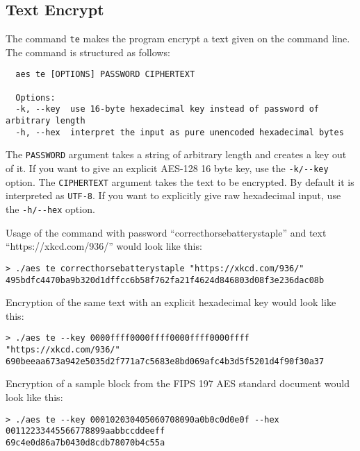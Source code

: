 \subsection{Text Encrypt}
The command \lstinline{te} makes the program encrypt a text given on the command line. The command is structured as follows:
\begin{lstlisting}
  aes te [OPTIONS] PASSWORD CIPHERTEXT

  Options:
  -k, --key  use 16-byte hexadecimal key instead of password of arbitrary length
  -h, --hex  interpret the input as pure unencoded hexadecimal bytes
\end{lstlisting}

The \lstinline{PASSWORD} argument takes a string of arbitrary length and creates a key out of it. If you want to give an explicit AES-128 16 byte key, use the \lstinline{-k/--key} option. The \lstinline{CIPHERTEXT} argument takes the text to be encrypted. By default it is interpreted as \lstinline{UTF-8}. If you want to explicitly give raw hexadecimal input, use the \lstinline{-h/--hex} option.

Usage of the command with password \enquote{correcthorsebatterystaple} and text \enquote{https://xkcd.com/936/} would look like this:
\begin{lstlisting}
> ./aes te correcthorsebatterystaple "https://xkcd.com/936/"
495bdfc4470ba9b320d1dffcc6b58f762fa21f4624d846803d08f3e236dac08b
\end{lstlisting}

Encryption of the same text with an explicit hexadecimal key would look like this:
\begin{lstlisting}
> ./aes te --key 0000ffff0000ffff0000ffff0000ffff "https://xkcd.com/936/"
690beeaa673a942e5035d2f771a7c5683e8bd069afc4b3d5f5201d4f90f30a37
\end{lstlisting}

Encryption of a sample block from the FIPS 197 AES standard document \cite{aes2001} would look like this:
\begin{lstlisting}
> ./aes te --key 000102030405060708090a0b0c0d0e0f --hex 00112233445566778899aabbccddeeff
69c4e0d86a7b0430d8cdb78070b4c55a
\end{lstlisting}

